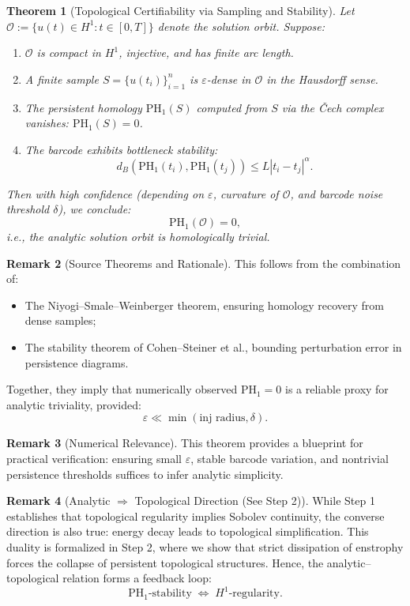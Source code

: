 \documentclass[11pt]{article}
\newtheorem{theorem}{Theorem}[section]
\theoremstyle{definition}
\newtheorem{remark}[theorem]{Remark}
\begin{document}
\begin{theorem}[Topological Certifiability via Sampling and Stability]
\label{thm:certifiability}
Let $\mathcal{O} := \{ u(t) \in H^1 : t \in [0,T] \}$ denote the solution orbit. Suppose:
\begin{enumerate}
    \item $\mathcal{O}$ is compact in $H^1$, injective, and has finite arc length.
    \item A finite sample $S = \{ u(t_i) \}_{i=1}^n$ is $\varepsilon$-dense in $\mathcal{O}$ in the Hausdorff sense.
    \item The persistent homology $\mathrm{PH}_1(S)$ computed from $S$ via the Čech complex vanishes: $\mathrm{PH}_1(S) = 0$.
    \item The barcode exhibits bottleneck stability:
    \[
    d_B(\mathrm{PH}_1(t_i), \mathrm{PH}_1(t_j)) \leq L|t_i - t_j|^\alpha.
    \]
\end{enumerate}
Then with high confidence (depending on $\varepsilon$, curvature of $\mathcal{O}$, and barcode noise threshold $\delta$), we conclude:
\[
\mathrm{PH}_1(\mathcal{O}) = 0,
\]
i.e., the analytic solution orbit is homologically trivial.
\end{theorem}

\begin{remark}[Source Theorems and Rationale]
This follows from the combination of:
\begin{itemize}
    \item The Niyogi–Smale–Weinberger theorem, ensuring homology recovery from dense samples;
    \item The stability theorem of Cohen–Steiner et al., bounding perturbation error in persistence diagrams.
\end{itemize}
Together, they imply that numerically observed $\mathrm{PH}_1 = 0$ is a reliable proxy for analytic triviality, provided:
\[
\varepsilon \ll \min(\text{inj radius}, \delta).
\]
\end{remark}

\begin{remark}[Numerical Relevance]
This theorem provides a blueprint for practical verification: ensuring small $\varepsilon$, stable barcode variation, and nontrivial persistence thresholds suffices to infer analytic simplicity.
\end{remark}

\begin{remark}[Analytic $\Rightarrow$ Topological Direction (See Step 2)]
While Step 1 establishes that topological regularity implies Sobolev continuity, the converse direction is also true: energy decay leads to topological simplification. This duality is formalized in Step 2, where we show that strict dissipation of enstrophy forces the collapse of persistent topological structures. Hence, the analytic–topological relation forms a feedback loop:
\[
\mathrm{PH}_1\text{-stability} \;\Longleftrightarrow\; H^1\text{-regularity}.
\]
\end{remark}
\end{document}
